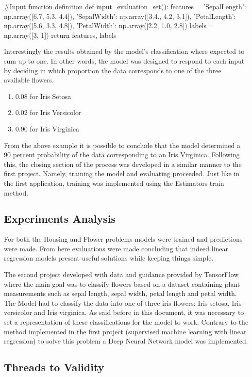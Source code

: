 \begin{tensorflow}[caption={ads}]
#Input function definition
def input_evaluation_set():
    features = {'SepalLength': np.array([6.7, 5.3, 4.4]),
                'SepalWidth':  np.array([3.4., 4.2, 3.1]),
                'PetalLength': np.array([5.6, 3.3, 4.8]),
                'PetalWidth':  np.array([2.2, 1.0, 2.8])}
    labels = np.array([3, 1])
    return features, labels
\end{tensorflow}

Interestingly the results obtained by the model's classification where expected to sum up to one. In other words, the model was designed to respond to each input by deciding in which proportion the data corresponds to one of the three available flowers. 

\begin{enumerate}
 \item 0.08 for Iris Setosa
 \item 0.02 for Iris Versicolor
 \item 0.90 for Iris Virginica
\end{enumerate}

From the above example it is possible to conclude that the model determined a 90 percent probability of the data corresponding to an Iris Virginica.   Following this, the closing section of the process was developed in a similar manner to the first project. Namely, training the model and evaluating proceeded. Just like in the first  application, training was implemented using the Estimators train method. 

\subsection{Experiments Analysis}

For both the Housing and Flower problems models were trained and predictions were made.  From here evaluations were made concluding that indeed linear regression models present useful solutions while keeping things simple. 

The second project developed with data and guidance provided by TensorFlow where the main goal was to classify flowers based on a dataset containing plant measurements such as sepal length, sepal width, petal length and petal width. The Model had to classify the data into one of three iris flowers: Iris setosa, Iris versicolor and Iris virginica.  As said before in this document, it was necessary to set a representation of these classifications for the model to work. Contrary to the method implemented in the first project (supervised machine learning with linear regression) to solve this problem a Deep Neural Network model was implemented. 


\subsection{Threads to Validity}



\endinput



